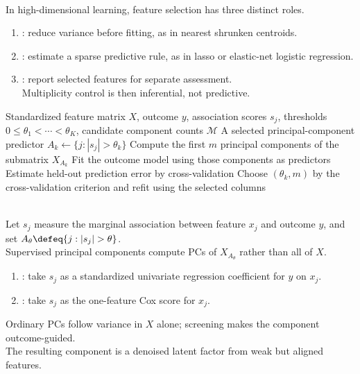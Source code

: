 \begin{remark} \label{rem:sl-high-dimensional-feature-selection-roles} \\
In high-dimensional learning, feature selection has three distinct roles.
\begin{enumerate}[label=(\roman*)]
\setlength{\itemsep}{0pt}
\item {}: reduce variance before fitting, as in nearest shrunken centroids.
\item {}: estimate a sparse predictive rule, as in lasso or elastic-net logistic regression.
\item {}: report selected features for separate assessment.\\
Multiplicity control is then inferential, not predictive.
\end{enumerate}
\end{remark}

\begin{breakablealgorithm}
\caption{Supervised Principal Components}
\label{alg:sl-supervised-principal-components}
\begin{algorithmic}
\Require Standardized feature matrix $X$, outcome $y$, association scores $s_j$, thresholds $0\leq\theta_1<\cdots<\theta_K$, candidate component counts $\mathcal{M}$
\Ensure A selected principal-component predictor
\State $A_k\gets\{j: |s_j|>\theta_k\}$
\State Compute the first $m$ principal components of the submatrix $X_{A_k}$
\State Fit the outcome model using those components as predictors
\State Estimate held-out prediction error by cross-validation
\EndFor
\EndFor
\State Choose $(\theta_k,m)$ by the cross-validation criterion and refit using the selected columns
\end{algorithmic}
\end{breakablealgorithm}

\begin{remark} \label{rem:sl-supervised-pc-latent-factor-view} \\
Let $s_j$ measure the marginal association between feature $x_j$ and outcome $y$, and set $A_\theta\defeq\{j:|s_j|>\theta\}$.\\
Supervised principal components compute PCs of $X_{A_\theta}$ rather than all of $X$.
\begin{enumerate}[label=(\roman*)]
\setlength{\itemsep}{0pt}
\item {}: take $s_j$ as a standardized univariate regression coefficient for $y$ on $x_j$.
\item {}: take $s_j$ as the one-feature Cox score for $x_j$.
\end{enumerate}
Ordinary PCs follow variance in $X$ alone; screening makes the component outcome-guided.\\
The resulting component is a denoised latent factor from weak but aligned features.
\end{remark}

